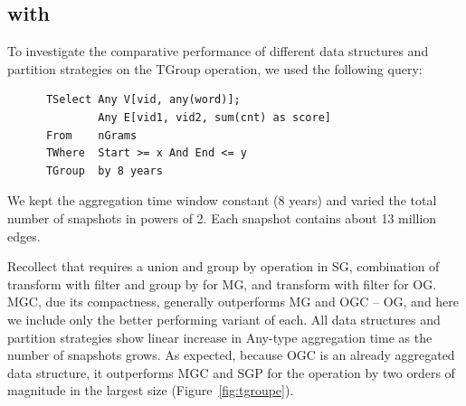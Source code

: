 \subsection{ with }

To investigate the comparative performance of different data
structures and partition strategies on the TGroup operation, we used
the following query:

\begin{small}
\begin{verbatim}
      TSelect Any V[vid, any(word)];
              Any E[vid1, vid2, sum(cnt) as score]
      From    nGrams
      TWhere  Start >= x And End <= y
      TGroup  by 8 years
\end{verbatim}
\end{small}

We kept the aggregation time window constant (8 years) and varied the
total number of snapshots in powers of 2.  Each snapshot contains
about 13 million edges.

Recollect that  requires a union and group by operation
in SG, combination of transform with filter and group by for MG, and
transform with filter for OG.  MGC, due its compactness, generally
outperforms MG and OGC -- OG, and here we include only the better
performing variant of each.  All data structures and partition
strategies show linear increase in Any-type aggregation time as the
number of snapshots grows.  As expected, because OGC is an already
aggregated data structure, it outperforms MGC and SGP for the
 operation by two orders of magnitude in the largest
size (Figure~\ref{fig:tgroupe}).

